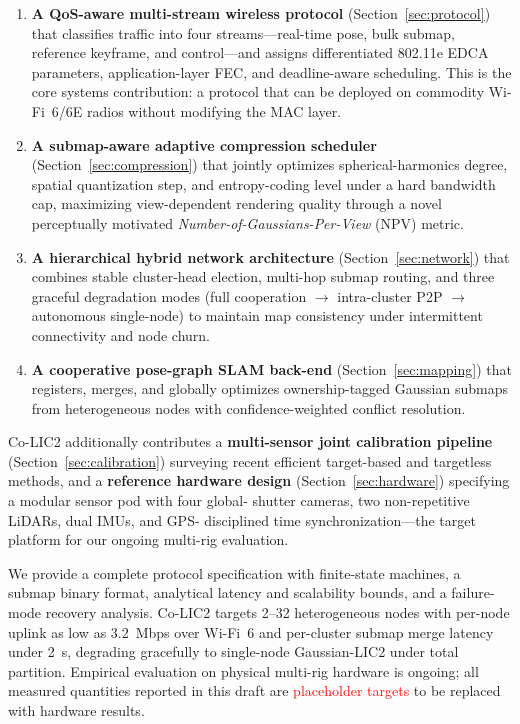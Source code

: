 \begin{enumerate}
  \item \textbf{A QoS-aware multi-stream wireless protocol}
  (Section~\ref{sec:protocol}) that classifies traffic into four
  streams---real-time pose, bulk submap, reference keyframe, and control---and
  assigns differentiated 802.11e EDCA parameters, application-layer FEC, and
  deadline-aware scheduling. This is the core systems contribution: a protocol
  that can be deployed on commodity Wi-Fi~6/6E radios without modifying the
  MAC layer.

  \item \textbf{A submap-aware adaptive compression scheduler}
  (Section~\ref{sec:compression}) that jointly optimizes spherical-harmonics
  degree, spatial quantization step, and entropy-coding level under a hard
  bandwidth cap, maximizing view-dependent rendering quality through a novel
  perceptually motivated \emph{Number-of-Gaussians-Per-View} (NPV) metric.

  \item \textbf{A hierarchical hybrid network architecture}
  (Section~\ref{sec:network}) that combines stable cluster-head election,
  multi-hop submap routing, and three graceful degradation modes (full
  cooperation $\to$ intra-cluster P2P $\to$ autonomous single-node) to
  maintain map consistency under intermittent connectivity and node churn.

  \item \textbf{A cooperative pose-graph SLAM back-end}
  (Section~\ref{sec:mapping}) that registers, merges, and globally optimizes
  ownership-tagged Gaussian submaps from heterogeneous nodes with
  confidence-weighted conflict resolution.
\end{enumerate}

Co-LIC2 additionally contributes a \textbf{multi-sensor joint calibration
pipeline} (Section~\ref{sec:calibration}) surveying recent efficient
target-based and targetless methods, and a \textbf{reference hardware design}
(Section~\ref{sec:hardware}) specifying a modular sensor pod with four global-
shutter cameras, two non-repetitive LiDARs, dual IMUs, and GPS-
disciplined time synchronization---the target platform for our ongoing
multi-rig evaluation.

We provide a complete protocol specification with finite-state machines, a
submap binary format, analytical latency and scalability bounds, and a
failure-mode recovery analysis. Co-LIC2 targets 2--32 heterogeneous nodes
with per-node uplink as low as 3.2~Mbps over Wi-Fi~6 and per-cluster submap
merge latency under 2~s, degrading gracefully to single-node Gaussian-LIC2
under total partition. Empirical evaluation on physical multi-rig hardware
is ongoing; all measured quantities reported in this draft are
\textcolor{red}{placeholder targets} to be replaced with hardware results.
